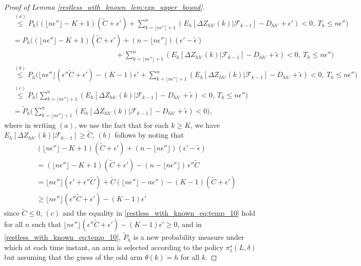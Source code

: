 \begin{proof}[Proof of Lemma \ref{restless_with_known_lem:exp_upper_bound}]
\begin{align}
	&\stackrel{(a)}{\leq} P_h\bigg((\lfloor n\epsilon''\rfloor-K+1)(\tilde{C}+\epsilon') + \sum\limits_{k=\lfloor n\epsilon''\rfloor+1}^n (E_h[\Delta Z_{hh'}(k)|\mathcal{F}_{k-1}]-D_{hh'}+{\epsilon'})<0,~T_h\leq n\epsilon''\bigg)\nonumber\\
	&=P_h\bigg((\lfloor n\epsilon''\rfloor-K+1)(\tilde{C}+\epsilon') +(n-\lfloor n\epsilon''\rfloor)(\epsilon'-\tilde{\epsilon})\nonumber\\
	&\hspace{6cm}+ \sum\limits_{k=\lfloor n\epsilon''\rfloor+1}^n (E_h[\Delta Z_{hh'}(k)|\mathcal{F}_{k-1}]-D_{hh'}+\tilde{\epsilon})<0,~T_h\leq n\epsilon''\bigg)\nonumber\\
	&\stackrel{(b)}{\leq} P_h\bigg(\lfloor n\epsilon''\rfloor(\epsilon''\tilde{C}+\epsilon') -(K-1)\epsilon'+ \sum\limits_{k=\lfloor n\epsilon''\rfloor+1}^n (E_h[\Delta Z_{hh'}(k)|\mathcal{F}_{k-1}]-D_{hh'}+\tilde{\epsilon})<0,~T_h\leq n\epsilon''\bigg)\nonumber\\
	&\stackrel{(c)}{\leq} P_h\bigg(\sum\limits_{k=\lfloor n\epsilon''\rfloor+1}^n (E_h[\Delta Z_{hh'}(k)|\mathcal{F}_{k-1}]-D_{hh'}+\tilde{\epsilon})<0,~T_h\leq n\epsilon''\bigg)\nonumber\\
	&=\tilde{P}_h\bigg(\sum\limits_{k=\lfloor n\epsilon''\rfloor+1}^n (E_h[\Delta Z_{hh'}(k)|\mathcal{F}_{k-1}]-D_{hh'}+\tilde{\epsilon})<0\bigg),\label{restless_with_known_eq:temp_10}
\end{align}
where in writing $(a)$, we use the fact that for each $k\geq K$, we have $E_h[\Delta Z_{hh'}(k)|\mathcal{F}_{k-1}]\geq \tilde{C}$, $(b)$ follows by noting that 
\begin{align}
&(\lfloor n\epsilon''\rfloor-K+1)(\tilde{C}+\epsilon') +(n-\lfloor n\epsilon''\rfloor)(\epsilon'-\tilde{\epsilon})\nonumber\\
&=(\lfloor n\epsilon''\rfloor-K+1)(\tilde{C}+\epsilon') -(n-\lfloor n\epsilon''\rfloor)\,\epsilon''\tilde{C}\nonumber\\
&=\lfloor n\epsilon''\rfloor(\epsilon' + \epsilon''\tilde{C})+\tilde{C}(\lfloor n\epsilon''\rfloor-n\epsilon'')-(K-1)(\tilde{C}+\epsilon')\nonumber\\
&\geq \lfloor n\epsilon''\rfloor(\epsilon''\tilde{C}+\epsilon') -(K-1)\epsilon'
\end{align}
since $\tilde{C}\leq 0$, $(c)$ and the equality in \eqref{restless_with_known_eq:temp_10} hold for all $n$ such that $\lfloor n\epsilon''\rfloor(\epsilon''\tilde{C}+\epsilon') -(K-1)\epsilon' \geq 0$, and in
  \eqref{restless_with_known_eq:temp_10}, $\tilde{P}_h$ is a new probability measure under which at each time instant, an arm is selected according to the policy $\pi_1^\star(L,\delta)$ but assuming that the guess of the odd arm $\theta(k)=h$ for all $k$. 


\end{proof}

